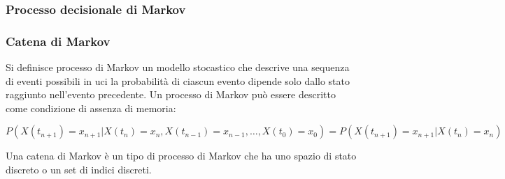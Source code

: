 \documentclass[../main.tex]{subfiles}
\begin{document}
\subsubsection{Processo decisionale di Markov}

\subsubsection{Catena di Markov}
Si definisce processo di Markov un modello stocastico che descrive una sequenza di eventi possibili in uci la probabilità di ciascun evento dipende solo dallo stato raggiunto nell'evento precedente. Un processo di Markov può essere descritto come condizione di assenza di memoria:
\begin{center}
\begin{math}
				P \left( X \left( t _ { n + 1 } \right) = x _ { n + 1 } | X \left( t _ { n } \right) = x _ { n } , X \left( t _ { n - 1 } \right) = x _ { n - 1 } , \ldots , X \left( t _ { 0 } \right) = x _ { 0 } \right) = P \left( X \left( t _ { n + 1 } \right) = x _ { n + 1 } | X \left( t _ { n } \right) = x _ { n } \right)
\end{math}
\end{center}

Una catena di Markov è un tipo di processo di Markov che ha uno spazio di stato discreto o un set di indici discreti. 
\end{document}
